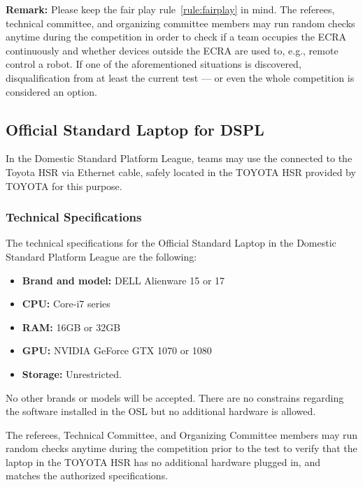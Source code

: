 \textbf{Remark:} Please keep the fair play rule~\ref{rule:fairplay} in mind. The referees, technical committee,
        and organizing committee members may run random checks anytime during the competition in order to check if a team
        occupies the ECRA continuously and whether devices outside the ECRA are used to, e.g., remote control a robot.
        If one of the aforementioned situations is discovered, disqualification from at least the current test --- or
        even the whole competition is considered an option.

\subsection{Official Standard Laptop for DSPL}
\label{rule:osl_dspl}
% 
% 


% 
% 
In the Domestic Standard Platform League, teams may use the  connected to the Toyota HSR via Ethernet cable, safely located in the TOYOTA HSR  provided by TOYOTA for this purpose.

\subsubsection{Technical Specifications}
The technical specifications for the Official Standard Laptop in the Domestic Standard Platform League are the following:


 \begin{itemize}
  \item \textbf{Brand and model:} DELL Alienware 15 or 17
  \item \textbf{CPU:} Core-i7 series
  \item \textbf{RAM:} 16GB or 32GB
  \item \textbf{GPU:} NVIDIA GeForce GTX 1070 or 1080
  \item \textbf{Storage:} Unrestricted.
\end{itemize}

No other brands or models will be accepted. There are no constrains regarding the software installed in the OSL but no additional hardware is allowed.

The referees, Technical Committee, and Organizing Committee members may run random checks anytime during the competition prior to the test to verify that the laptop in the TOYOTA HSR  has no additional hardware plugged in, and matches the authorized specifications.

